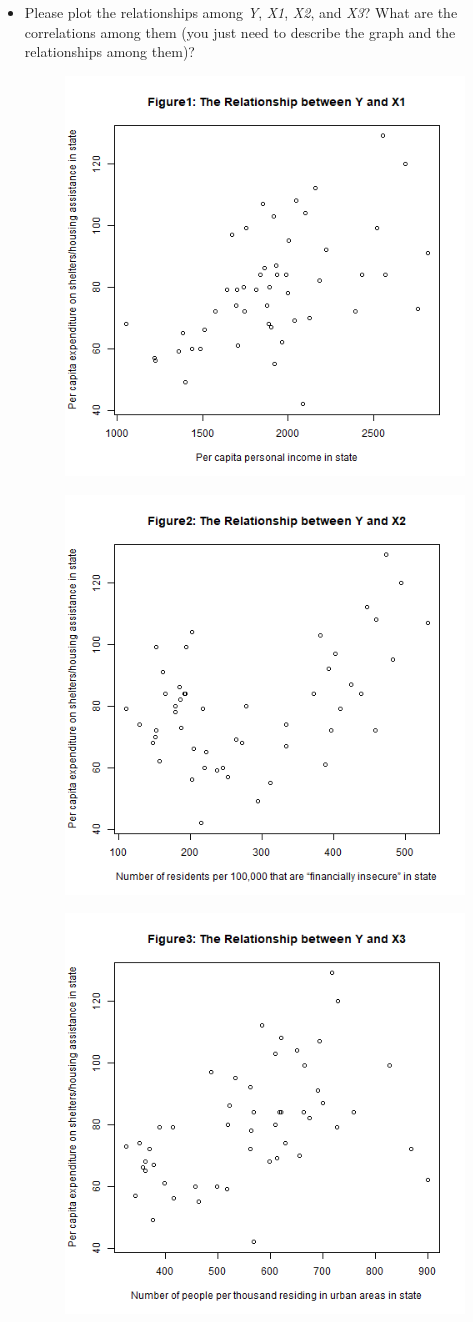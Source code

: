 \documentclass[12pt,letterpaper]{article}
\begin{document}
\begin{itemize}

  
\item
Please plot the relationships among \emph{Y}, \emph{X1}, \emph{X2}, and \emph{X3}? What are the correlations among them (you just need to describe the graph and the relationships among them)?
  
\begin{figure}[H]
	\centering
	\includegraphics[width=.6\textwidth]{Y~X1.png}
\end{figure}
\begin{figure}[H]
	\centering
	\includegraphics[width=.6\textwidth]{Y~X2.png}
\end{figure}
\begin{figure}[H]
	\centering
	\includegraphics[width=.6\textwidth]{Y~X3.png}

\end{figure}
\end{itemize}
\end{document}
